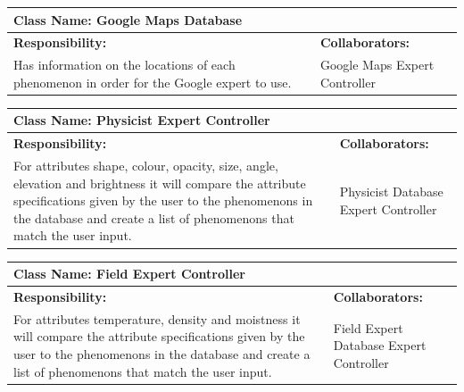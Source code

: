 \documentclass[]{article}
\begin{document}
	\begin{table}[!hb]
		\centering
		\begin{tabular}{|p{5cm}|p{5cm}|}
		\hline 
		 \multicolumn{2}{|l|}{\textbf{Class Name: Google Maps Database}} \\
		\hline
		\textbf{Responsibility:} & \textbf{Collaborators:} \\
		\hline
		Has information on the locations of each phenomenon in order for the Google expert to use. & Google Maps Expert Controller\\
		\hline
		\end{tabular}
	\end{table}

	\begin{table}[!hb]
		\centering
		\begin{tabular}{|p{5cm}|p{5cm}|}
		\hline 
		 \multicolumn{2}{|l|}{\textbf{Class Name: Physicist Expert Controller}} \\
		\hline
		\textbf{Responsibility:} & \textbf{Collaborators:} \\
		\hline
		For attributes shape, colour, opacity, size, angle, elevation and brightness it will compare the attribute specifications given by the user to the phenomenons in the database and create a list of phenomenons that match the user input.  & Physicist Database \newline Expert Controller \\
		\hline
		\end{tabular}
	\end{table}
	
	\begin{table}[!hb]
		\centering
		\begin{tabular}{|p{5cm}|p{5cm}|}
		\hline 
		 \multicolumn{2}{|l|}{\textbf{Class Name: Field Expert Controller}} \\
		\hline
		\textbf{Responsibility:} & \textbf{Collaborators:} \\
		\hline
		For attributes temperature, density and moistness it will compare the attribute specifications given by the user to the phenomenons in the database and create a list of phenomenons that match the user input. & Field Expert Database \newline Expert Controller\\
		\hline
		\end{tabular}
	\end{table}
	
\end{document}
